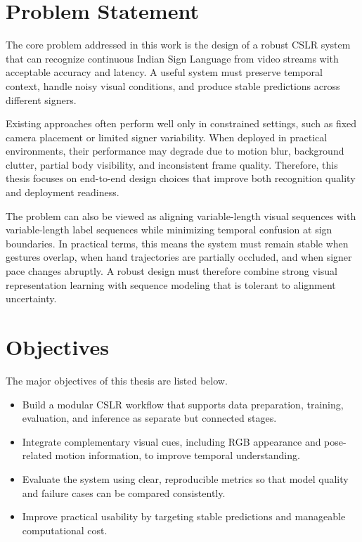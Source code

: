 \section{Problem Statement}

The core problem addressed in this work is the design of a robust CSLR system that can recognize continuous Indian Sign Language from video streams with acceptable accuracy and latency. A useful system must preserve temporal context, handle noisy visual conditions, and produce stable predictions across different signers.

Existing approaches often perform well only in constrained settings, such as fixed camera placement or limited signer variability. When deployed in practical environments, their performance may degrade due to motion blur, background clutter, partial body visibility, and inconsistent frame quality. Therefore, this thesis focuses on end-to-end design choices that improve both recognition quality and deployment readiness.

The problem can also be viewed as aligning variable-length visual sequences with variable-length label sequences while minimizing temporal confusion at sign boundaries. In practical terms, this means the system must remain stable when gestures overlap, when hand trajectories are partially occluded, and when signer pace changes abruptly. A robust design must therefore combine strong visual representation learning with sequence modeling that is tolerant to alignment uncertainty.

\section{Objectives}

The major objectives of this thesis are listed below.

\begin{itemize}
\item Build a modular CSLR workflow that supports data preparation, training, evaluation, and inference as separate but connected stages.
\item Integrate complementary visual cues, including RGB appearance and pose-related motion information, to improve temporal understanding.
\item Evaluate the system using clear, reproducible metrics so that model quality and failure cases can be compared consistently.
\item Improve practical usability by targeting stable predictions and manageable computational cost.
\end{itemize}

